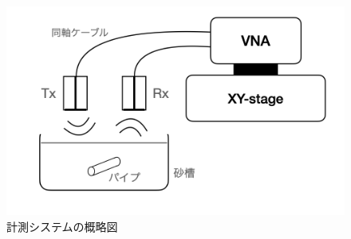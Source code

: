 \documentclass[11pt,a4paper,uplatex,draft]{ujarticle}
\begin{document}
    \begin{figure}[hbtp]
      \centering
      \includegraphics[keepaspectratio, width=130mm]{Images/XYstage_configuration.png}
      \caption{計測システムの概略図}\label{fig:XYstage_configuration}
    \end{figure}
\end{document}
